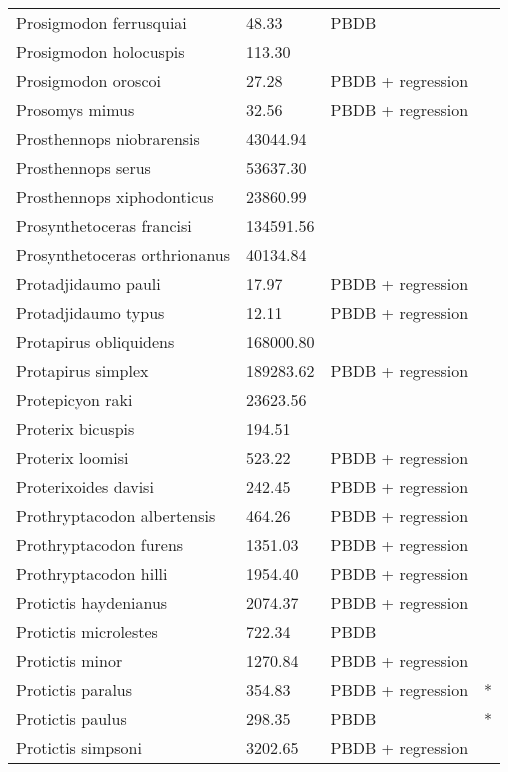 \documentclass{article}
\begin{document}
\begin{center}
\begin{longtable}{p{} p{} p{} p{}}
    Prosigmodon ferrusquiai & 48.33 & PBDB &  \\ 
    Prosigmodon holocuspis & 113.30 & \cite{Tomiya2013} &  \\ 
    Prosigmodon oroscoi & 27.28 & PBDB + regression &  \\ 
    Prosomys mimus & 32.56 & PBDB + regression &  \\ 
    Prosthennops niobrarensis & 43044.94 & \cite{Tomiya2013} &  \\ 
    Prosthennops serus & 53637.30 & \cite{Tomiya2013} &  \\ 
    Prosthennops xiphodonticus & 23860.99 & \cite{Tomiya2013} &  \\ 
    Prosynthetoceras francisi & 134591.56 & \cite{Tomiya2013} &  \\ 
    Prosynthetoceras orthrionanus & 40134.84 & \cite{Tomiya2013} &  \\ 
    Protadjidaumo pauli & 17.97 & PBDB + regression &  \\ 
    Protadjidaumo typus & 12.11 & PBDB + regression &  \\ 
    Protapirus obliquidens & 168000.80 & \cite{Rose1982a} &  \\ 
    Protapirus simplex & 189283.62 & PBDB + regression &  \\ 
    Protepicyon raki & 23623.56 & \cite{Tomiya2013} &  \\ 
    Proterix bicuspis & 194.51 & \cite{Coombs1979} &  \\ 
    Proterix loomisi & 523.22 & PBDB + regression &  \\ 
    Proterixoides davisi & 242.45 & PBDB + regression &  \\ 
    Prothryptacodon albertensis & 464.26 & PBDB + regression &  \\ 
    Prothryptacodon furens & 1351.03 & PBDB + regression &  \\ 
    Prothryptacodon hilli & 1954.40 & PBDB + regression &  \\ 
    Protictis haydenianus & 2074.37 & PBDB + regression &  \\ 
    Protictis microlestes & 722.34 & PBDB &  \\ 
    Protictis minor & 1270.84 & PBDB + regression &  \\ 
    Protictis paralus & 354.83 & PBDB + regression & * \\ 
    Protictis paulus & 298.35 & PBDB & * \\ 
    Protictis simpsoni & 3202.65 & PBDB + regression &  \\ 

\end{longtable}
\end{center}
\end{document}
